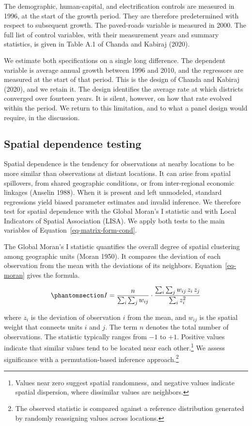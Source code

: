 \documentclass[
  letterpaper,
  DIV=11,
  numbers=noendperiod]{scrartcl}
\begin{document}
The demographic, human-capital, and electrification controls are
measured in 1996, at the start of the growth period. They are therefore
predetermined with respect to subsequent growth. The paved-roads
variable is measured in 2000. The full list of control variables, with
their measurement years and summary statistics, is given in Table A.1 of
Chanda and Kabiraj (2020).

We estimate both specifications on a single long difference. The
dependent variable is average annual growth between 1996 and 2010, and
the regressors are measured at the start of that period. This is the
design of Chanda and Kabiraj (2020), and we retain it. The design
identifies the average rate at which districts converged over fourteen
years. It is silent, however, on how that rate evolved within the
period. We return to this limitation, and to what a panel design would
require, in the discussion.

\subsection{Spatial dependence
testing}\label{spatial-dependence-testing}

Spatial dependence is the tendency for observations at nearby locations
to be more similar than observations at distant locations. It can arise
from spatial spillovers, from shared geographic conditions, or from
inter-regional economic linkages (Anselin 1988). When it is present and
left unmodeled, standard regressions yield biased parameter estimates
and invalid inference. We therefore test for spatial dependence with the
Global Moran's I statistic and with Local Indicators of Spatial
Association (LISA). We apply both tests to the main variables of
Equation~\ref{eq-matrix-form-cond}.

The Global Moran's I statistic quantifies the overall degree of spatial
clustering among geographic units (Moran 1950). It compares the
deviation of each observation from the mean with the deviations of its
neighbors. Equation~\ref{eq-moran} gives the formula.

\begin{equation}\phantomsection\label{eq-moran}{
I=\frac{n}{\sum_i \sum_j w_{ij}} \cdot \frac{\sum_i \sum_j w_{ij} \, z_i \, z_j}{\sum_i z_i^2}
}\end{equation}

where \(z_i\) is the deviation of observation \(i\) from the mean, and
\(w_{ij}\) is the spatial weight that connects units \(i\) and \(j\).
The term \(n\) denotes the total number of observations. The statistic
typically ranges from \(-1\) to \(+1\). Positive values indicate that
similar values tend to be located near each other.\footnote{Values near
  zero suggest spatial randomness, and negative values indicate spatial
  dispersion, where dissimilar values are neighbors.} We assess
significance with a permutation-based inference approach.\footnote{The
  observed statistic is compared against a reference distribution
  generated by randomly reassigning values across locations.}
\end{document}
